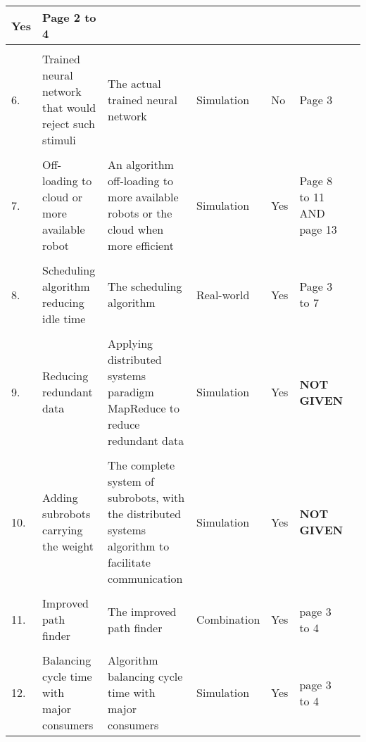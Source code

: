 \begin{table}[h]
\begin{tabular}{p{0.1cm}p{5cm}p{3cm}p{2cm}p{2cm}p{4cm}p{5cm}}
                {Yes} &
                {Page 2 to 4} \\
            \hline
            \\
            {6.} &
                {Trained neural network that would reject such stimuli} &
                {The actual trained neural network} &
                {Simulation} &
                {No} &
                {Page 3} \\
            \hline
            \\
            {7.} &
                {Off-loading to cloud or more available robot} &
                {An algorithm off-loading to more available robots or the cloud when more efficient} &
                {Simulation} &
                {Yes} &
                {Page 8 to 11 AND page 13} \\
            \hline
            \\
            {8.} &
                {Scheduling algorithm reducing idle time} &
                {The scheduling algorithm} &
                {Real-world} &
                {Yes} &
                {Page 3 to 7} \\
            \hline
            \\
            {9.} &
                {Reducing redundant data} &
                {Applying distributed systems paradigm MapReduce to reduce redundant data} &
                {Simulation} &
                {Yes} &
                {\textbf{NOT GIVEN}} \\
            \hline
            \\
            {10.} &
                {Adding subrobots carrying the weight} &
                {The complete system of subrobots, with the distributed systems algorithm to 
                facilitate communication} &
                {Simulation} &
                {Yes} &
                {\textbf{NOT GIVEN}} \\
            \hline
            \\
            {11.} &
                {Improved path finder} &
                {The improved path finder} &
                {Combination} &
                {Yes} &
                {page 3 to 4} \\
            \hline
            \\
            {12.} &
                {Balancing cycle time with major consumers} &
                {Algorithm balancing cycle time with major consumers} &
                {Simulation} &
                {Yes} &
                {page 3 to 4} \\

\end{tabular}
\end{table}
